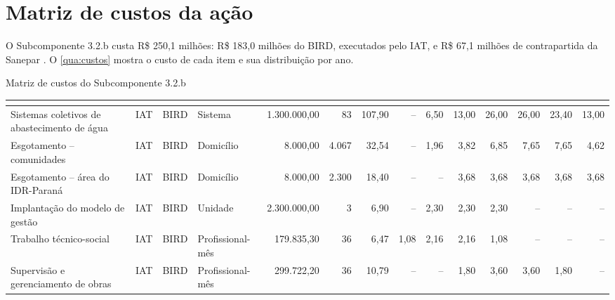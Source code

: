 \section{Matriz de custos da ação}
\label{sec:custos}

O Subcomponente 3.2.b custa R\$ 250,1 milhões: R\$ 183,0 milhões do BIRD,
executados pelo IAT, e R\$ 67,1 milhões de contrapartida da Sanepar
\cite{custo2026}. O \autoref{qua:custos} mostra o custo de cada item e sua
distribuição por ano.

\begin{landscape}
\begin{quadro}[p]
\caption{Matriz de custos do Subcomponente 3.2.b}
\label{qua:custos}
\scriptsize
\renewcommand{\arraystretch}{1.3}
\setlength{\tabcolsep}{3pt}
\begin{tabularx}{\linewidth}{|L|Q{1.5cm}|Q{1.85cm}|P{1.7cm}|r|r|r|r|r|r|r|r|r|r|}
\hline
{} &  &  &  &
 &  &
 &
 &  &
 &  &
 &  &
 \\ \hline
Sistemas coletivos de abastecimento de água & IAT & BIRD & Sistema &
  1.300.000,00 & 83 & 107,90 & -- & 6,50 & 13,00 & 26,00 & 26,00 & 23,40 & 13,00 \\ \hline
Esgotamento -- comunidades & IAT & BIRD & Domicílio &
  8.000,00 & 4.067 & 32,54 & -- & 1,96 & 3,82 & 6,85 & 7,65 & 7,65 & 4,62 \\ \hline
Esgotamento -- área do IDR-Paraná & IAT & BIRD & Domicílio &
  8.000,00 & 2.300 & 18,40 & -- & -- & 3,68 & 3,68 & 3,68 & 3,68 & 3,68 \\ \hline
Implantação do modelo de gestão & IAT & BIRD & Unidade &
  2.300.000,00 & 3 & 6,90 & -- & 2,30 & 2,30 & 2,30 & -- & -- & -- \\ \hline
Trabalho técnico-social & IAT & BIRD & Profissional-mês &
  179.835,30 & 36 & 6,47 & 1,08 & 2,16 & 2,16 & 1,08 & -- & -- & -- \\ \hline
Supervisão e gerenciamento de obras & IAT & BIRD & Profissional-mês &
  299.722,20 & 36 & 10,79 & -- & -- & 1,80 & 3,60 & 3,60 & 1,80 & -- \\ \hline

\end{tabularx}
\end{quadro}
\end{landscape}

